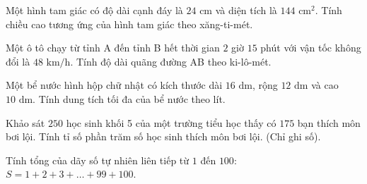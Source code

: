\begin{ex} %
Một hình tam giác có độ dài cạnh đáy là $24\text{ cm}$ và diện tích là $144\text{ cm}^2$. Tính chiều cao tương ứng của hình tam giác theo xăng-ti-mét.
\end{ex}

\begin{ex} %
Một ô tô chạy từ tỉnh A đến tỉnh B hết thời gian $2$ giờ $15$ phút với vận tốc không đổi là $48\text{ km/h}$. Tính độ dài quãng đường AB theo ki-lô-mét.
\end{ex}

\begin{ex} %
Một bể nước hình hộp chữ nhật có kích thước dài $16\text{ dm}$, rộng $12\text{ dm}$ và cao $10\text{ dm}$. Tính dung tích tối đa của bể nước theo lít.
\end{ex}

\begin{ex} %
Khảo sát $250$ học sinh khối 5 của một trường tiểu học thấy có $175$ bạn thích môn bơi lội. Tính tỉ số phần trăm số học sinh thích môn bơi lội. (Chỉ ghi số).
\end{ex}

\begin{ex} %
Tính tổng của dãy số tự nhiên liên tiếp từ $1$ đến $100$: $S = 1 + 2 + 3 + \dots + 99 + 100$.
\end{ex}

